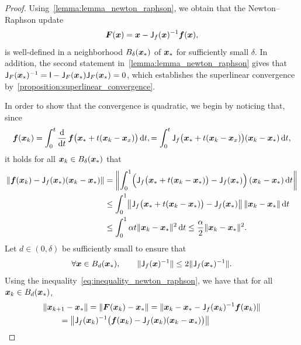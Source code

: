 \begin{proof}
    Using~\cref{lemma:lemma_newton_raphson},
    we obtain that the Newton--Raphson update
    \[
        \mathbf{\boldsymbol{F}}(\mathbf{\boldsymbol{x}}) = \mathbf{\boldsymbol{x}} - \mathsf J_{f}(\mathbf{\boldsymbol{x}})^{-1} \mathbf{\boldsymbol{f}}(\mathbf{\boldsymbol{x}}),
    \]
    is well-defined in a neighborhood $B_{\delta}(\mathbf{\boldsymbol{x}}_*)$ of $\mathbf{\boldsymbol{x}}_*$
    for sufficiently small $\delta$.
    In addition, the second statement in~\cref{lemma:lemma_newton_raphson} gives that $\mathsf J_F(\mathbf{\boldsymbol{x}}_*)^{-1} = \mathsf I - \mathsf J_F(\mathbf{\boldsymbol{x}}_*) \mathsf J_F(\mathbf{\boldsymbol{x}}_*) = 0$,
    which establishes the superlinear convergence by~\cref{proposition:superlinear_convergence}.

    In order to show that the convergence is quadratic,
    we begin by noticing that,
    since
    \[
        \mathbf{\boldsymbol{f}}(\mathbf{\boldsymbol{x}}_k)
        = \int_{0}^{t} \frac{\mathrm d}{\mathrm d t} \, \mathbf{\boldsymbol{f}}\bigl(\mathbf{\boldsymbol{x}}_* + t(\mathbf{\boldsymbol{x}}_k - \mathbf{\boldsymbol{x}}_x) \bigr) \, \mathrm d t,
        = \int_{0}^{t} \mathsf J_f\bigl(\mathbf{\boldsymbol{x}}_* + t(\mathbf{\boldsymbol{x}}_k - \mathbf{\boldsymbol{x}}_x) \bigr) (\mathbf{\boldsymbol{x}}_k - \mathbf{\boldsymbol{x}}_*) \, \mathrm d t,
    \]
    it holds for all $\mathbf{\boldsymbol{x}}_k \in B_{\delta}(\mathbf{\boldsymbol{x}}_*)$ that
    \begin{align}
        \notag
        \norm{\vect f(\vect x_k) - \mat J_f(\vect x_*) (\vect x_k - \vect x_*)}
        &= \norm*{\int_{0}^{1} \Bigl( \mat J_f\bigl(\vect x_* + t(\vect x_k - \vect x_*)\bigr) - \mat J_f(\vect x_*) \Bigr)  \, (\vect x_k - \vect x_*) \, \d t} \\
        \notag
        &\leq \int_{0}^{1} \norm*{\mat J_f\bigl(\vect x_* + t(\vect x_k - \vect x_*)\bigr) - \mat J_f(\vect x_*) }  \, \norm {\vect x_k - \vect x_*} \, \d t \\
        \label{eq:inequality_newton_raphson}
        &\leq \int_{0}^{1} \alpha t \norm {\vect x_k - \vect x_*}^2 \, \d t
        \leq \frac{\alpha}{2} \norm{\vect x_k - \vect x_*}^2.
    \end{align}
    Let $d \in (0, \delta)$ be sufficiently small to ensure that
    \[
        \forall \mathbf{\boldsymbol{x}} \in B_{d}(\mathbf{\boldsymbol{x}}_*),
        \qquad \lVert\mathsf J_f(\mathbf{\boldsymbol{x}})^{-1}\rVert \leq 2 \lVert\mathsf J_f(\mathbf{\boldsymbol{x}}_*)^{-1}\rVert.
    \]
    Using the inequality~\eqref{eq:inequality_newton_raphson},
    we have that for all $\mathbf{\boldsymbol{x}}_k \in B_{d}(\mathbf{\boldsymbol{x}}_*)$,
    \begin{align*}
        &\norm{\vect x_{k+1} - \vect x_*}
        = \norm{\vect F(\vect x_{k}) - \vect x_*}
        = \norm{\vect x_k - \vect x_* - \mat J_f(\vect x_k)^{-1} \vect f(\vect x_k)} \\
        &\qquad = \norm*{\mat J_f(\vect x_k)^{-1} \bigl(\vect f(\vect x_k) - \mat J_f(\vect x_k) (\vect x_k - \vect x_*) \bigr) }

\end{align*}
\end{proof}
